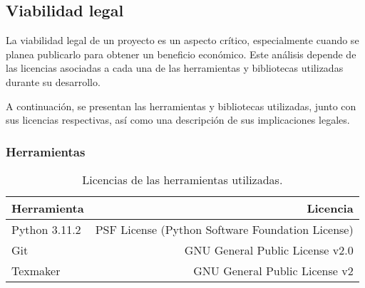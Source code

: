 \subsection{Viabilidad legal}

La viabilidad legal de un proyecto es un aspecto crítico, especialmente cuando se planea publicarlo para obtener un beneficio económico. Este análisis depende de las licencias asociadas a cada una de las herramientas y bibliotecas utilizadas durante su desarrollo.

A continuación, se presentan las herramientas y bibliotecas utilizadas, junto con sus licencias respectivas, así como una descripción de sus implicaciones legales.

\subsubsection{Herramientas}

\begin{table}[H]
\centering
\begin{tabular}{lr}
\toprule
Herramienta & Licencia \\ 
\midrule
Python 3.11.2 & PSF License (Python Software Foundation License) \\ 
Git & GNU General Public License v2.0 \\ 
Texmaker & GNU General Public License v2 \\ 
\bottomrule
\end{tabular}
\caption{Licencias de las herramientas utilizadas.}
\end{table}

